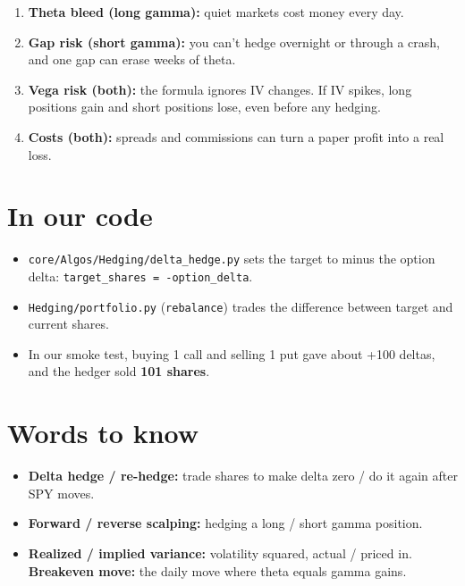 \documentclass{article}
\begin{document}
\begin{enumerate}

\item \textbf{Theta bleed (long gamma):} quiet markets cost money every day.

\item \textbf{Gap risk (short gamma):} you can't hedge overnight or through a crash, and one gap can erase weeks of theta.

\item \textbf{Vega risk (both):} the formula ignores IV changes. If IV spikes, long positions gain and short positions lose, even before any hedging.

\item \textbf{Costs (both):} spreads and commissions can turn a paper profit into a real loss.

\end{enumerate}

\section{In our code}

\begin{itemize}

\item \texttt{core/\allowbreak{}Algos/\allowbreak{}Hedging/\allowbreak{}delta\_\allowbreak{}hedge.\allowbreak{}py} sets the target to minus the option delta: \texttt{target\_\allowbreak{}shares = -\allowbreak{}option\_\allowbreak{}delta}.

\item \texttt{Hedging/\allowbreak{}portfolio.\allowbreak{}py} (\texttt{rebalance}) trades the difference between target and current shares.

\item In our smoke test, buying 1 call and selling 1 put gave about +100 deltas, and the hedger sold \textbf{101 shares}.

\end{itemize}

\section{Words to know}

\begin{itemize}

\item \textbf{Delta hedge /\allowbreak{} re-hedge:} trade shares to make delta zero /\allowbreak{} do it again after SPY moves.

\item \textbf{Forward /\allowbreak{} reverse scalping:} hedging a long /\allowbreak{} short gamma position.

\item \textbf{Realized /\allowbreak{} implied variance:} volatility squared, actual /\allowbreak{} priced in. \textbf{Breakeven move:} the daily move where theta equals gamma gains.

\end{itemize}
\end{document}
